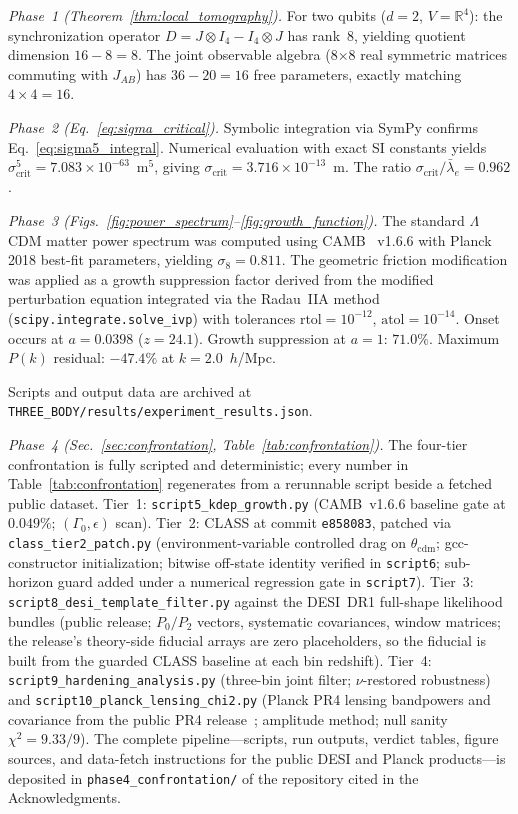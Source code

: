 \documentclass[aps,prd,twocolumn,superscriptaddress,nofootinbib]{revtex4-2}
\theoremstyle{definition}
\theoremstyle{remark}
\newcommand{\R}{\mathbb{R}}
\newcommand{\sigcrit}{\sigma_{\mathrm{crit}}}
\begin{document}
\textit{Phase~1 (Theorem~\ref{thm:local_tomography}).} For two qubits
($d = 2$, $V = \R^4$): the synchronization operator
$D = J \otimes I_4 - I_4 \otimes J$ has rank~8, yielding quotient
dimension $16 - 8 = 8$. The joint observable algebra (8$\times$8 real
symmetric matrices commuting with $J_{AB}$) has $36 - 20 = 16$ free
parameters, exactly matching $4 \times 4 = 16$.

\textit{Phase~2 (Eq.~\eqref{eq:sigma_critical}).} Symbolic integration
via SymPy confirms Eq.~\eqref{eq:sigma5_integral}. Numerical evaluation
with exact SI constants yields $\sigma^5_{\mathrm{crit}} = 7.083 \times
10^{-63}$~m$^5$, giving $\sigcrit = 3.716 \times 10^{-13}$~m.
The ratio $\sigcrit / \bar{\lambda}_e = 0.962$.

\textit{Phase~3 (Figs.~\ref{fig:power_spectrum}--\ref{fig:growth_function}).}
The standard $\Lambda$CDM matter power spectrum was computed using
CAMB~\cite{CAMB2000} v1.6.6 with Planck 2018 best-fit parameters,
yielding $\sigma_8 = 0.811$. The geometric friction modification was
applied as a growth suppression factor derived from the modified
perturbation equation integrated via the Radau~IIA method
(\texttt{scipy.integrate.solve\_ivp}) with tolerances $\mathrm{rtol} =
10^{-12}$, $\mathrm{atol} = 10^{-14}$. Onset occurs at $a = 0.0398$
($z = 24.1$). Growth suppression at $a = 1$: $71.0\%$. Maximum
$P(k)$ residual: $-47.4\%$ at $k = 2.0$~$h$/Mpc.

Scripts and output data are archived at
\texttt{THREE\_BODY/results/experiment\_results.json}.

\textit{Phase~4 (Sec.~\ref{sec:confrontation}, Table~\ref{tab:confrontation}).}
The four-tier confrontation is fully scripted and deterministic; every
number in Table~\ref{tab:confrontation} regenerates from a rerunnable
script beside a fetched public dataset. Tier~1:
\texttt{script5\_kdep\_growth.py} (CAMB~v1.6.6 baseline gate at
$0.049\%$; $(\Gamma_0,\epsilon)$ scan). Tier~2: CLASS at commit
\texttt{e858083}, patched via \texttt{class\_tier2\_patch.py}
(environment-variable controlled drag on
$\theta_{\mathrm{cdm}}$; gcc-constructor initialization; bitwise
off-state identity verified in \texttt{script6}; sub-horizon guard
added under a numerical regression gate in \texttt{script7}). Tier~3:
\texttt{script8\_desi\_template\_filter.py} against the DESI~DR1
full-shape likelihood bundles (public release; $P_0/P_2$ vectors,
systematic covariances, window matrices; the release's theory-side
fiducial arrays are zero placeholders, so the fiducial is built from
the guarded CLASS baseline at each bin redshift). Tier~4:
\texttt{script9\_hardening\_analysis.py} (three-bin joint filter;
$\nu$-restored robustness) and \texttt{script10\_planck\_lensing\_chi2.py}
(Planck PR4 lensing bandpowers and covariance from the public PR4
release~\cite{CarronPR42022}; amplitude method; null sanity
$\chi^2 = 9.33/9$). The complete pipeline---scripts, run outputs,
verdict tables, figure sources, and data-fetch instructions for the
public DESI and Planck products---is deposited in
\texttt{phase4\_confrontation/} of the repository cited in the
Acknowledgments.
\end{document}
